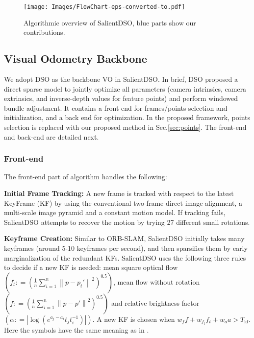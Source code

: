 \documentclass[letterpaper, 10 pt, conference]{ieeeconf}  %
\begin{document}
\begin{figure}[t!]
    \centering
    \texttt{[image: Images/FlowChart-eps-converted-to.pdf]}
    \caption{Algorithmic overview of SalientDSO, blue parts show our contributions.}
    \label{fig:FlowChart}
\end{figure}


\subsection{Visual Odometry Backbone}
We adopt DSO \cite{DSO} as the backbone VO in SalientDSO. In brief, DSO\cite{DSO} proposed a direct sparse model to jointly optimize all parameters (camera intrinsics, camera extrinsics, and inverse-depth values for feature points) and perform windowed bundle adjustment. It contains a front end for frames/points selection and initialization, and a back end for optimization. In the proposed framework, points selection is replaced with our proposed method in Sec.\ref{sec:points}. The front-end and back-end are detailed next.\\

\subsubsection{Front-end}
The front-end part of algorithm handles the following:

\textbf{Initial Frame Tracking:} A new frame is tracked with respect to the latest KeyFrame (KF) by using the conventional two-frame direct image alignment, a multi-scale image pyramid and a constant motion model. If tracking fails, SalientDSO attempts to recover the motion by trying 27 different small rotations.

\textbf{Keyframe Creation:} Similar to ORB-SLAM\cite{ORBSLAM}, SalientDSO initially takes many keyframes (around 5-10 keyframes per second), and then sparsifies them by early marginalization of the redundant KFs. SalientDSO uses the following three rules to decide if a new KF is needed: mean square optical flow $\left({f_t}: = \left( {\tfrac{1}{n}\sum_{i = 1}^n {{{\left\| {p - {p_t}'} \right\|}^2}} } \right)^{0.5}\right)$, mean flow without rotation $\left( f: = \left( {\tfrac{1}{n}\sum_{i = 1}^n {{{\left\| {p - p'} \right\|}^2}} } \right)^{0.5}\right)$ and relative brightness factor $\left( \alpha : = \left| {\log \left( {{e^{{a_j} - {a_i}}}{t_j}t_i^{ - 1}} \right)} \right|\right)$. A new KF is chosen when $ w_f f + w_{f_t} f_t + w_a a > T_{\text{kf}}$. Here the symbols have the same meaning as in \cite{DSO}.
\end{document}
